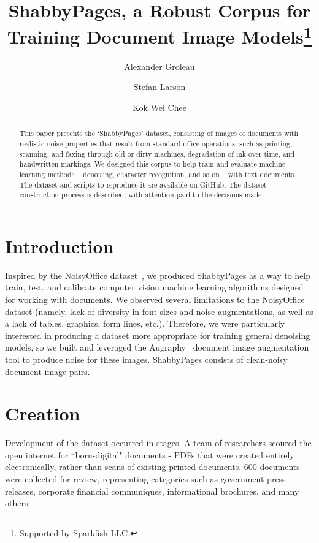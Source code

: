 \documentclass[runningheads]{llncs}
\begin{document}
\title{ShabbyPages, a Robust Corpus for Training Document Image Models\thanks{Supported by Sparkfish LLC.}}

\author{Alexander Groleau \and
  Stefan Larson \and
  Kok Wei Chee}

%
\maketitle

\begin{abstract}
This paper presents the ‘ShabbyPages’ dataset, consisting of images of documents with realistic noise properties that result from standard office operations, such as printing, scanning, and faxing through old or dirty machines, degradation of ink over time, and handwritten markings. We designed this corpus to help train and evaluate machine learning methods -- denoising, character recognition, and so on -- with text documents. The dataset and scripts to reproduce it are available on GitHub. The dataset construction process is described, with attention paid to the decisions made.

\end{abstract}

\section{Introduction}
Inspired by the NoisyOffice dataset~\cite{ref_url1}, we produced ShabbyPages as a way to help train, test, and calibrate computer vision machine learning algorithms designed for working with documents. We observed several limitations to the NoisyOffice dataset (namely, lack of diversity in font sizes and noise augmentations, as well as a lack of tables, graphics, form lines, etc.). Therefore, we were particularly interested in producing a dataset more appropriate for training general denoising models, so we built and leveraged the Augraphy~\cite{ref_url2} document image augmentation tool to produce noise for these images. ShabbyPages consists of  clean-noisy document image pairs.

\section{Creation}
Development of the dataset occurred in stages. A team of researchers scoured the open internet for ``born-digital" documents - PDFs that were created entirely electronically, rather than scans of existing printed documents. 600 documents were collected for review, representing categories such as government press releases, corporate financial communiques, informational brochures, and many others.\\
\end{document}
